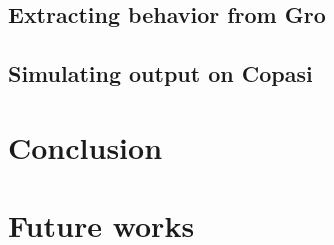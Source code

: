 \documentclass[12pt]{article}
\begin{document}
        

\subsection{Extracting behavior from Gro}
    \lipsum[1]
    
\subsection{Simulating output on Copasi}
    \lipsum[1]

\section{Conclusion}
    \lipsum[1]
    
\section{Future works}
    \lipsum[1]



\end{document}
